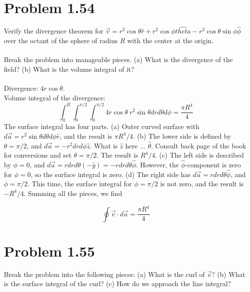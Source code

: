 \documentclass[10pt]{article}
\begin{document}
\maketitle

\section{Problem 1.54}

Verify the divergence theorem for $\vec{v} = r^2 \cos\theta \hat{r} + r^2 \cos\phi \hat{theta} - r^2 \cos\theta \sin\phi \hat{\phi}$ over the octant of the sphere of radius $R$ with the center at the origin. \\ \\
Break the problem into manageable pieces. (a) What is the divergence of the field? (b) What is the volume integral of it? \\ \\
Divergence: $4r\cos\theta$. \\
Volume integral of the divergence:
\begin{equation}
\int_0^R \int_0^{\pi/2} \int_0^{\pi/2} 4 r \cos\theta ~ r^2 \sin\theta dr d\theta d\phi = \frac{\pi R^4}{4}
\end{equation}
The surface integral has four parts. (a) Outer curved surface with $d\vec{a} = r^2 \sin\theta d\theta d\phi \hat{r}$, and the result is $\pi R^4/4$.  (b) The lower side is defined by $\theta = \pi/2$, and $d\vec{a} = -r^2 dr d\phi \hat{z}$.  What is $\hat{z}$ here ... $\hat{\theta}$. Consult back page of the book for conversions and set $\theta = \pi/2$.  The result is $R^4/4$. (c)  The left side is described by $\phi = 0$, and $d\vec{a} = r dr d\theta (-\hat{y}) = -r dr d\theta \hat{\phi}$.  However, the $\hat{\phi}$-component is zero for $\phi = 0$, so the surface integral is zero.  (d) The right side has $d\vec{a} = r dr d\theta \hat{\phi}$, and $\phi = \pi/2$.  This time, the surface integral for $\phi = \pi/2$ is not zero, and the result is $-R^4/4$.  Summing all the pieces, we find

\begin{equation}
\oint \vec{v} \cdot d\vec{a} = \frac{\pi R^4}{4}
\end{equation}

\section{Problem 1.55}

Break the problem into the following pieces: (a) What is the curl of $\vec{v}$?  (b) What is the surface integral of the curl?  (c) How do we approach the line integral? \\ \\
\end{document}
